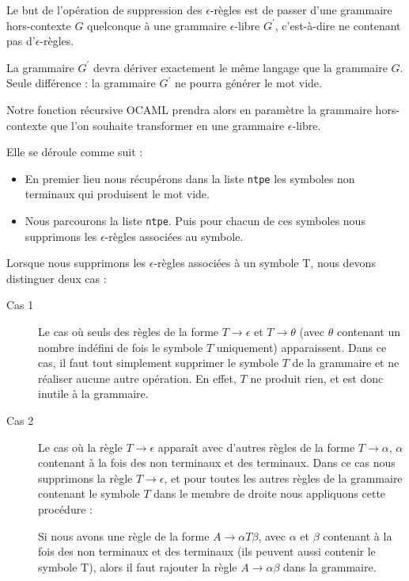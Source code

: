 \documentclass[11pt,a4paper]{article}
\def\code#1{\texttt{#1}} %
\begin{document}
Le but de l'opération de suppression des $\epsilon$-règles
est de passer d'une grammaire hors-contexte $G$ quelconque 
à une grammaire $\epsilon$-libre $G^\prime$, c'est-à-dire ne 
contenant pas d'$\epsilon$-règles.

La grammaire $G^\prime$ devra dériver exactement le même
langage que la grammaire $G$. Seule différence : la grammaire
$G^\prime$ ne pourra générer le mot vide.
\newline

Notre fonction récursive OCAML prendra alors en paramètre 
la grammaire hors-contexte que l'on souhaite transformer
en une grammaire $\epsilon$-libre.

Elle se déroule comme suit : 

\begin{itemize}
    \item En premier lieu nous récupérons dans la liste \code{ntpe}
    les symboles non terminaux qui produisent le mot vide. 
    \item Nous parcourons la liste \code{ntpe}. Puis pour chacun de
    ces symboles nous supprimons les $\epsilon$-règles associées au symbole.
\end{itemize}

Lorsque nous supprimons les $\epsilon$-règles associées à un 
symbole T, nous devons distinguer deux cas : 
\begin{description}
    \item[Cas 1] Le cas où seuls des règles de la forme
        $T \rightarrow \epsilon$ et $T \rightarrow \theta$
        (avec $\theta$ contenant un nombre indéfini de
        fois le symbole $T$ uniquement) apparaissent. Dans ce cas, il faut 
        tout simplement supprimer le symbole $T$ de la grammaire et ne réaliser
        aucune autre opération. En effet, $T$ ne produit rien, et est
        donc inutile à la grammaire.
    \item[Cas 2] Le cas où la règle $T \rightarrow \epsilon$ apparaît avec d'autres
        règles de la forme $T \rightarrow \alpha$, $\alpha$ contenant
        à la fois des non terminaux et des terminaux. Dans ce cas nous supprimons
        la règle $T \rightarrow \epsilon$, et pour toutes les autres règles de la grammaire
        contenant le symbole $T$ dans le membre de droite nous appliquons cette
        procédure : 
        
        Si nous avons une règle de la forme $A \rightarrow \alpha T \beta$,
        avec $\alpha$ et $\beta$ contenant à la fois des non terminaux et des terminaux
        (ils peuvent aussi contenir  le symbole T), alors il faut rajouter la règle
        $A \rightarrow \alpha \beta$ dans la grammaire.
\end{description}
\end{document}
